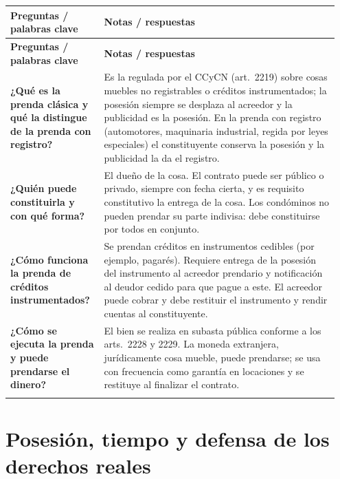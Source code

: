 \documentclass[12pt,oneside]{book}
\makeatletter
\newenvironment{cornell}{%
    \par\vspace{0.5em}
    \noindent
    \begin{longtable}{@{}>{\raggedright\arraybackslash}p{0.27\linewidth}
                         >{\raggedright\arraybackslash}p{0.68\linewidth}@{}}
    \toprule
    \textbf{Preguntas / palabras clave} & \textbf{Notas / respuestas} \\
    \midrule
    \endfirsthead
    \toprule
    \textbf{Preguntas / palabras clave} & \textbf{Notas / respuestas} \\
    \midrule
    \endhead
}{%
    \bottomrule
    \end{longtable}
}
\newcommand{\cornellsummary}[1]{%
    \midrule
    \multicolumn{2}{@{}p{\dimexpr0.95\linewidth+2\tabcolsep\relax}@{}}{%
        \vspace{0.2em}\textbf{Resumen:} #1\vspace{0.2em}} \\
}
\makeatother
\begin{document}
\begin{cornell}
\textbf{¿Qué es la prenda clásica y qué la distingue de la prenda con registro?} &
Es la regulada por el CCyCN (art.~2219) sobre cosas muebles no registrables o créditos instrumentados; la posesión siempre se desplaza al acreedor y la publicidad es la posesión. En la prenda con registro (automotores, maquinaria industrial, regida por leyes especiales) el constituyente conserva la posesión y la publicidad la da el registro. \\

\textbf{¿Quién puede constituirla y con qué forma?} &
El dueño de la cosa. El contrato puede ser público o privado, siempre con fecha cierta, y es requisito constitutivo la entrega de la cosa. Los condóminos no pueden prendar su parte indivisa: debe constituirse por todos en conjunto. \\

\textbf{¿Cómo funciona la prenda de créditos instrumentados?} &
Se prendan créditos en instrumentos cedibles (por ejemplo, pagarés). Requiere entrega de la posesión del instrumento al acreedor prendario y notificación al deudor cedido para que pague a este. El acreedor puede cobrar y debe restituir el instrumento y rendir cuentas al constituyente. \\

\textbf{¿Cómo se ejecuta la prenda y puede prendarse el dinero?} &
El bien se realiza en subasta pública conforme a los arts.~2228 y 2229. La moneda extranjera, jurídicamente cosa mueble, puede prendarse; se usa con frecuencia como garantía en locaciones y se restituye al finalizar el contrato. \\

\cornellsummary{La prenda clásica del Código Civil y Comercial recae sobre muebles no registrables o créditos instrumentados, exige siempre la entrega de la posesión al acreedor y no debe confundirse con la prenda con registro, figura especial regulada por leyes separadas en la que el constituyente conserva la posesión.}
\end{cornell}

\part{Posesión, tiempo y defensa de los derechos reales}

\end{document}
